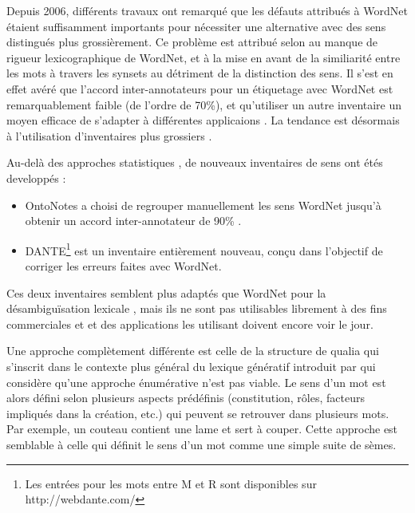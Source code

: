 Depuis 2006, différents travaux \citep{navigli2007semeval,hovy2006ontonotes}
ont remarqué que les défauts attribués à WordNet
\citep{snow2007learning,ide2007making} étaient suffisamment importants pour
nécessiter une alternative avec des sens distingués plus grossièrement. Ce
problème est attribué selon \cite{edmonds2002introduction} au manque de rigueur
lexicographique de WordNet, et à la mise en avant de la similiarité entre les
mots à travers les synsets au détriment de la distinction des sens. Il s'est en
effet avéré que l'accord inter-annotateurs pour un étiquetage avec WordNet est
remarquablement faible (de l'ordre de 70\%), et qu'utiliser un autre inventaire
un moyen efficace de s'adapter à différentes applicaions
\citep{palmer2004different}. La tendance est désormais à l'utilisation
d'inventaires plus grossiers \citep{navigli2007semeval,navigli2012quick}.


Au-delà des approches statistiques \citep{snow2007learning}, de nouveaux
inventaires de sens ont étés developpés :

\begin{itemize}

    \item OntoNotes \citep{hovy2006ontonotes} a choisi de regrouper
        manuellement les sens WordNet jusqu'à obtenir un accord
        inter-annotateur de 90\% .

    \item DANTE\footnote{Les entrées pour les mots entre M et R sont
        disponibles sur http://webdante.com/} \citep{mccarthy2010dante} est un
        inventaire entièrement nouveau, conçu dans l'objectif de corriger les
        erreurs faites avec WordNet\citep{kilgarriff2010detailed}.


\end{itemize}

Ces deux inventaires semblent plus adaptés que WordNet pour la désambiguïsation
lexicale \citep{navigli2012quick}, mais ils ne sont pas utilisables librement à
des fins commerciales et et des applications les utilisant doivent encore voir
le jour.

Une approche complètement différente est celle de la structure de qualia
\citep{johnston1996qualia} qui s'inscrit dans le contexte plus général du
lexique génératif introduit par \cite{pustejovsky1991generative} qui considère
qu'une approche énumérative n'est pas viable. Le sens d'un mot est alors défini
selon plusieurs aspects prédéfinis (constitution, rôles, facteurs impliqués
dans la création, etc.) qui peuvent se retrouver dans plusieurs mots. Par
exemple, un couteau contient une lame et sert à couper. Cette approche est
semblable à celle qui définit le sens d'un mot comme une simple suite de sèmes.


